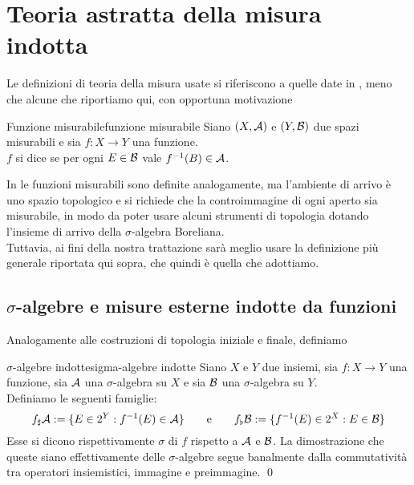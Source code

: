 \documentclass{article}
\renewcommand\A{\mc{A}}
\begin{document}
\pagebreak
\section{Teoria astratta della misura indotta}

Le definizioni di teoria della misura usate si riferiscono a quelle date in \cite{Delladio2023}, meno che alcune che riportiamo qui, con opportuna motivazione

\begin{definition}{Funzione misurabile}{funzione misurabile}
    Siano $(X,\A)$ e $(Y,\mathcal{B})$ due spazi misurabili e sia $f : X\to Y$ una funzione.\\
    $f$ si dice  se per ogni $E \in \mathcal{B}$ vale $f^{-1}(B) \in \A$.
\end{definition}

In \cite{Delladio2023} le funzioni misurabili sono definite analogamente, ma l'ambiente di arrivo è uno spazio topologico e si richiede che la controimmagine di ogni aperto sia misurabile, in modo da poter usare alcuni strumenti di topologia dotando l'insieme di arrivo della $\sigma$-algebra Boreliana.\\
Tuttavia, ai fini della nostra trattazione sarà meglio usare la definizione più generale riportata qui sopra, che quindi è quella che adottiamo.

\subsection{$\sigma$-algebre e misure esterne indotte da funzioni}

Analogamente alle costruzioni di topologia iniziale e finale, definiamo 

\begin{definition}{$\sigma$-algebre indotte}{sigma-algebre indotte}
    Siano $X$ e $Y$ due insiemi, sia $f : X \to Y$ una funzione, sia $\A$ una $\sigma$-algebra su $X$ e sia $\mathcal{B}$ una $\sigma$-algebra su $Y$.\\
    Definiamo le seguenti famiglie:
    \[f_\sharp \A := \{E \in 2^Y : f^{-1}(E)\in \A\}\qquad \text{e}\qquad f_\flat\B := \{f^{-1}(E) \in 2^X : E \in \B \}\]
    Esse si dicono rispettivamente $\sigma$ di $f$ rispetto a $\A$ e $\mathcal{B}$.
    \proof 
    La dimostrazione che queste siano effettivamente delle $\sigma$-algebre segue banalmente dalla commutatività tra operatori insiemistici, immagine e preimmagine.
    \qed
\end{definition}
\end{document}
